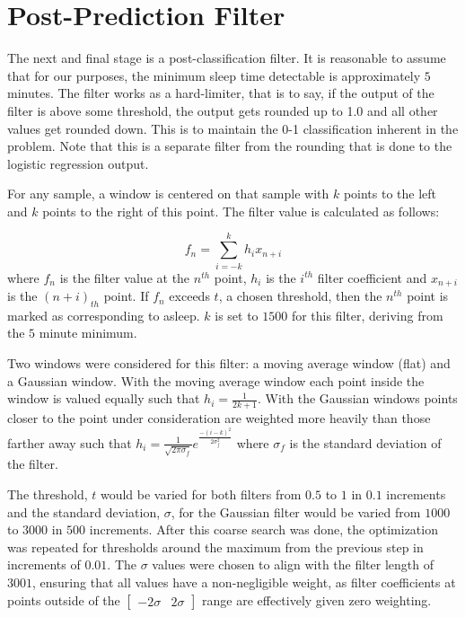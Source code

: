         \section{Post-Prediction Filter}

            The next and final stage is a post-classification filter. It is reasonable to assume that for our purposes, the minimum sleep time detectable is approximately $5$ minutes. The filter works as a hard-limiter, that is to say, if the output of the filter is above some threshold, the output gets rounded up to 1.0 and all other values get rounded down. This is to maintain the 0-1 classification inherent in the problem. Note that this is a separate filter from the rounding that is done to the logistic regression output.

            For any sample, a window is centered on that sample with $k$ points to the left and $k$ points to the right of this point. The filter value is calculated as follows:

            \begin{equation}
                f_n = \sum_{i=-k}^k h_ix_{n+i}
            \end{equation}
            where $f_n$ is the filter value at the $n^{th}$ point, $h_i$ is the $i^{th}$ filter coefficient and $x_{n+i}$ is the $(n+i)_{th}$ point. If $f_n$ exceeds $t$, a chosen threshold, then the $n^{th}$ point is marked as corresponding to asleep. $k$ is set to $1500$ for this filter, deriving from the $5$ minute minimum. 

            Two windows were considered for this filter: a moving average window (flat) and a Gaussian window. With the moving average window each point inside the window is valued equally such that $h_i = \frac{1}{2k + 1}$. With the Gaussian windows points closer to the point under consideration are weighted more heavily than those farther away such that $h_i = \frac{1}{\sqrt{2\pi \sigma_f}}e^{\frac{-(i-k)^2}{2\sigma_f^2}}$ where $\sigma_f$ is the standard deviation of the filter.

            The threshold, $t$ would be varied for both filters from $0.5$ to $1$ in $0.1$ increments and the standard deviation, $\sigma$, for the Gaussian filter would be varied from $1000$ to $3000$ in $500$ increments. After this coarse search was done, the optimization was repeated for thresholds around the maximum from the previous step in increments of $0.01$. The $\sigma$ values were chosen to align with the filter length of $3001$, ensuring that all values have a non-negligible weight, as filter coefficients at points outside of the $\begin{bmatrix}-2\sigma & 2\sigma \end{bmatrix}$ range are effectively given zero weighting.

